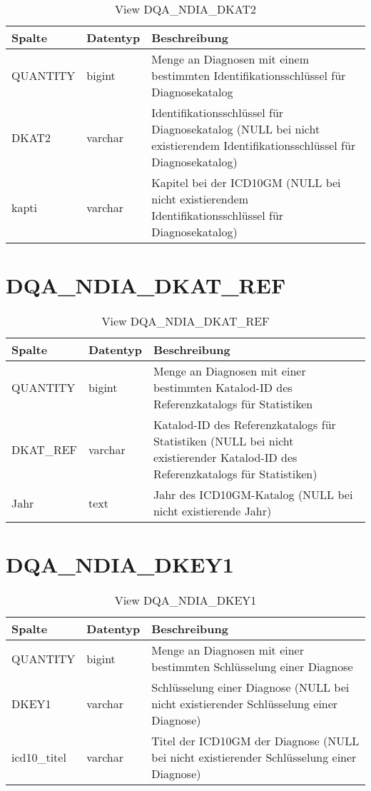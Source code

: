   \begin{table}[ht]
    \centering
    \caption{View DQA\_NDIA\_DKAT2}
    \label{tab:dqandiadkat2}
    \begin{tabular}{||l|l|p{10cm}||}
      \hline
      Spalte & Datentyp & Beschreibung \\ [0.5ex] \hline \hline
QUANTITY & bigint & Menge an Diagnosen mit einem bestimmten Identifikationsschlüssel für Diagnosekatalog \\ \hline
DKAT2 & varchar & Identifikationsschlüssel für Diagnosekatalog (NULL bei nicht existierendem Identifikationsschlüssel für Diagnosekatalog)\\ \hline
kapti & varchar & Kapitel bei der ICD10GM (NULL bei nicht existierendem Identifikationsschlüssel für Diagnosekatalog)\\ \hline
    \end{tabular}
  \end{table}
 \clearpage
  \section{DQA\_NDIA\_DKAT\_REF}

  \begin{table}[ht]
    \centering
    \caption{View DQA\_NDIA\_DKAT\_REF}
    \label{tab:dqandiadkatref}
    \begin{tabular}{||l|l|p{10cm}||}
      \hline
      Spalte & Datentyp & Beschreibung \\ [0.5ex] \hline \hline
QUANTITY & bigint & Menge an Diagnosen mit einer bestimmten Katalod-ID des Referenzkatalogs für Statistiken \\ \hline
DKAT\_REF & varchar & Katalod-ID des Referenzkatalogs für Statistiken (NULL bei nicht existierender Katalod-ID des Referenzkatalogs für Statistiken)\\ \hline
Jahr & text & Jahr des ICD10GM-Katalog (NULL bei nicht existierende Jahr)\\ \hline
    \end{tabular}
  \end{table}

  \section{DQA\_NDIA\_DKEY1}

  \begin{table}[ht]
    \centering
    \caption{View DQA\_NDIA\_DKEY1}
    \label{tab:dqandiadkey1}
    \begin{tabular}{||l|l|p{10cm}||}
      \hline
      Spalte & Datentyp & Beschreibung \\ [0.5ex] \hline \hline
QUANTITY & bigint & Menge an Diagnosen mit einer bestimmten Schlüsselung einer Diagnose \\ \hline
DKEY1 & varchar & Schlüsselung einer Diagnose (NULL bei nicht existierender Schlüsselung einer Diagnose)\\ \hline
icd10\_titel & varchar & Titel der ICD10GM der Diagnose (NULL bei nicht existierender Schlüsselung einer Diagnose)\\ \hline
    \end{tabular}
  \end{table}
 \clearpage
